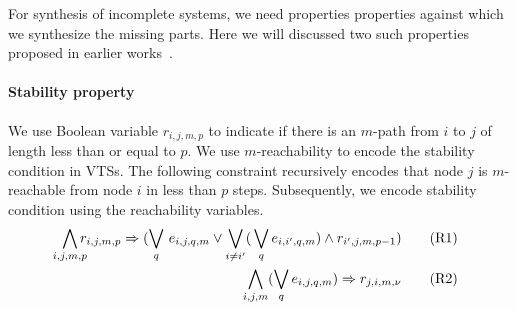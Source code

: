 For synthesis of incomplete systems,
we need properties properties against which we synthesize the missing parts.
%
Here we will discussed two such properties proposed in earlier
works~\cite{SASBpaper}.
%

\paragraph{Stability property}
%
We use Boolean variable $r_{i,j,m,p}$ to indicate if there is an
$m$-path from $i$ to $j$ of length less than or equal to $p$.
%
We use $m$-reachability to encode the stability condition in VTSs.
%
The following constraint recursively encodes that node $j$ is $m$-reachable from node $i$ in less than $p$ steps.
%
Subsequently, we encode stability condition using the reachability variables.
\begin{align}
  \bigwedge\limits_{\mathclap{i,j,m,p}} r_{i,j,m,p} \limplies (\bigvee_{q} \, e_{i,j,q,m} \lor \bigvee_{i\neq i^{\prime}} ( \, \bigvee_{q} e_{i,i^{\prime},q,m}) \land r_{i^{\prime},j,m,p-1} )
  \tag{R1}\label{eq:reach1}\\
 \bigwedge\limits_{i,j,m} (\bigvee_{q} e_{i,j,q,m}) \limplies r_{j,i,m,\nu}
  \tag{R2}\label{eq:reach2}
\end{align}

